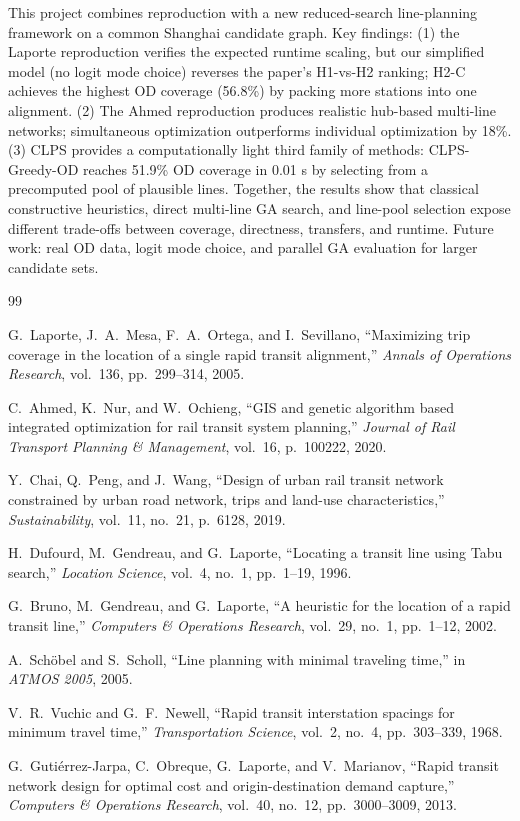 \documentclass[conference]{IEEEtran}
\begin{document}
This project combines reproduction with a new reduced-search line-planning
framework on a common Shanghai candidate graph. Key findings: (1) the
Laporte reproduction verifies the expected runtime scaling, but our
simplified model (no logit mode choice) reverses the paper's H1-vs-H2
ranking; H2-C achieves the highest OD coverage (56.8\%) by packing more
stations into one alignment. (2) The Ahmed reproduction produces realistic
hub-based multi-line networks; simultaneous optimization outperforms
individual optimization by 18\%. (3) CLPS provides a computationally light
third family of methods: CLPS-Greedy-OD reaches 51.9\% OD coverage in
0.01 s by selecting from a precomputed pool of plausible lines. Together,
the results show that classical constructive heuristics, direct multi-line
GA search, and line-pool selection expose different trade-offs between
coverage, directness, transfers, and runtime. Future work: real OD data,
logit mode choice, and parallel GA evaluation for larger candidate sets.


\begin{thebibliography}{99}

G.~Laporte, J.~A.~Mesa, F.~A.~Ortega, and I.~Sevillano,
``Maximizing trip coverage in the location of a single rapid transit
alignment,'' \emph{Annals of Operations Research}, vol.~136, pp.~299--314,
2005.

C.~Ahmed, K.~Nur, and W.~Ochieng,
``GIS and genetic algorithm based integrated optimization for rail transit
system planning,'' \emph{Journal of Rail Transport Planning \& Management},
vol.~16, p.~100222, 2020.

Y.~Chai, Q.~Peng, and J.~Wang,
``Design of urban rail transit network constrained by urban road network,
trips and land-use characteristics,'' \emph{Sustainability}, vol.~11,
no.~21, p.~6128, 2019.

H.~Dufourd, M.~Gendreau, and G.~Laporte,
``Locating a transit line using Tabu search,'' \emph{Location Science},
vol.~4, no.~1, pp.~1--19, 1996.

G.~Bruno, M.~Gendreau, and G.~Laporte,
``A heuristic for the location of a rapid transit line,''
\emph{Computers \& Operations Research}, vol.~29, no.~1, pp.~1--12, 2002.

A.~Sch\"{o}bel and S.~Scholl,
``Line planning with minimal traveling time,''
in \emph{ATMOS 2005}, 2005.

V.~R.~Vuchic and G.~F.~Newell,
``Rapid transit interstation spacings for minimum travel time,''
\emph{Transportation Science}, vol.~2, no.~4, pp.~303--339, 1968.

G.~Guti\'{e}rrez-Jarpa, C.~Obreque, G.~Laporte, and V.~Marianov,
``Rapid transit network design for optimal cost and origin-destination
demand capture,'' \emph{Computers \& Operations Research}, vol.~40,
no.~12, pp.~3000--3009, 2013.

\end{thebibliography}
\end{document}
